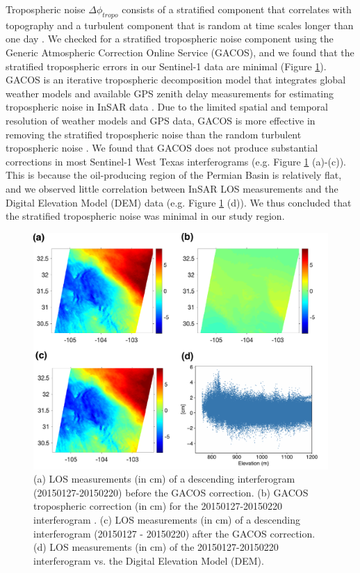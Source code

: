 \documentclass{utexasthesis}
\begin{document}
Tropospheric noise $\Delta \phi_{tropo}$ consists of a stratified component that correlates with topography \citep{Doin2009CorrectionsStratifiedTropospheric} and a turbulent component that is random at time scales longer than one day \citep{Emardson2003NeutralAtmosphericDelay}. We checked for a stratified tropospheric noise component using the Generic Atmospheric Correction Online Service (GACOS), and we found that the stratified tropospheric errors in our Sentinel-1 data are minimal (Figure \ref{fig:GACOS}).  GACOS is an iterative tropospheric decomposition model that integrates global weather models and available GPS zenith delay measurements for estimating tropospheric noise in InSAR data \citep{Yu2018InterferometricSyntheticAperture}. Due to the limited spatial and temporal resolution of weather models and GPS data, GACOS is more effective in removing the stratified tropospheric noise \citep{Doin2009CorrectionsStratifiedTropospheric} than the random turbulent tropospheric noise \citep{Emardson2003NeutralAtmosphericDelay}. We found that GACOS does not produce substantial corrections in most Sentinel-1 West Texas interferograms (e.g. Figure \ref{fig:GACOS} (a)-(c)). This is because the oil-producing region of the Permian Basin is relatively flat, and we observed little correlation between InSAR LOS measurements and the Digital Elevation Model (DEM) data (e.g. Figure \ref{fig:GACOS} (d)). We thus concluded that the stratified tropospheric noise was minimal in our study region.


\begin{figure}
	\centering
	\includegraphics[width=\textwidth]{paper1-permian/figures/supplement/figureS4-gacos.pdf}		
	\caption[GACOS tropospheric corrections]{(a) LOS measurements (in cm) of a descending interferogram (20150127-20150220) before the GACOS correction. (b) GACOS tropospheric correction (in cm) for the 20150127-20150220 interferogram \citep{Yu2018InterferometricSyntheticAperture}. (c) LOS measurements (in cm) of a descending interferogram (20150127 - 20150220) after the GACOS correction. (d) LOS measurements (in cm) of the 20150127-20150220 interferogram vs. the Digital Elevation Model (DEM).}
	\label{fig:GACOS}
\end{figure}
\end{document}
